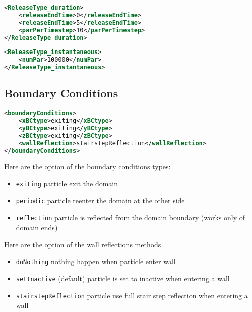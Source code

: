 \begin{lstlisting}[language=XML]
<ReleaseType_duration>
    <releaseEndTime>0</releaseEndTime>
    <releaseEndTime>5</releaseEndTime>
    <parPerTimestep>10</parPerTimestep>
</ReleaseType_duration>
\end{lstlisting}

\begin{lstlisting}[language=XML]
<ReleaseType_instantaneous>
    <numPar>100000</numPar>
</ReleaseType_instantaneous>
\end{lstlisting}

\subsection{Boundary Conditions}
\begin{lstlisting}[language=XML]
<boundaryConditions>
    <xBCtype>exiting</xBCtype>
    <yBCtype>exiting</yBCtype>
    <zBCtype>exiting</zBCtype>
    <wallReflection>stairstepReflection</wallReflection>
</boundaryConditions>
\end{lstlisting}

\noindent Here are the option of the boundary conditions types:
\begin{itemize}
    \item \texttt{exiting} particle exit the domain
    \item \texttt{periodic} particle reenter the domain at the other side
    \item \texttt{reflection} particle is reflected from the domain boundary (works only of domain ends)
\end{itemize}

\noindent Here are the option of the wall reflections methods
\begin{itemize}
    \item \texttt{doNothing} nothing happen when particle enter wall
    \item \texttt{setInactive} (default) particle is set to inactive when entering a wall
    \item \texttt{stairstepReflection} particle use full stair step reflection when entering a wall
\end{itemize}


